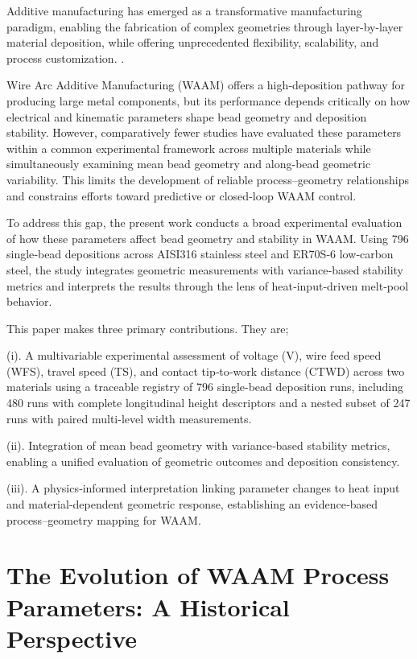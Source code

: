 \documentclass[conference]{IEEEtran}
\begin{document}
Additive manufacturing has emerged as a transformative manufacturing paradigm, enabling the fabrication of complex geometries through layer-by-layer material deposition, while offering unprecedented flexibility, scalability, and process customization. \cite{salinas2023blockchain,Lewandowski2016Review}. 

Wire Arc Additive Manufacturing (WAAM) offers a high‑deposition pathway for producing large metal components, but its performance depends critically on how electrical and kinematic parameters shape bead geometry and deposition stability. However, comparatively fewer studies have evaluated these parameters within a common experimental framework across multiple materials while simultaneously examining mean bead geometry and along-bead geometric variability. This limits the development of reliable process–geometry relationships and constrains efforts toward predictive or closed‑loop WAAM control.

To address this gap, the present work conducts a broad experimental evaluation of how these parameters affect bead geometry and stability in WAAM. Using 796 single‑bead depositions across AISI316 stainless steel and ER70S‑6 low‑carbon steel, the study integrates geometric measurements with variance‑based stability metrics and interprets the results through the lens of heat‑input‑driven melt‑pool behavior.

This paper makes three primary contributions. They are;

(i). A multivariable experimental assessment of voltage (V), wire feed speed (WFS), travel speed (TS), and contact tip‑to‑work distance (CTWD) across two materials using a traceable registry of 796 single-bead deposition runs, including 480 runs with complete longitudinal height descriptors and a nested subset of 247 runs with paired multi-level width measurements.

(ii). Integration of mean bead geometry with variance‑based stability metrics, enabling a unified evaluation of geometric outcomes and deposition consistency.

(iii). A physics‑informed interpretation linking parameter changes to heat input and material‑dependent geometric response, establishing an evidence‑based process–geometry mapping for WAAM.

\section{The Evolution of WAAM Process Parameters: A Historical Perspective}
\end{document}
